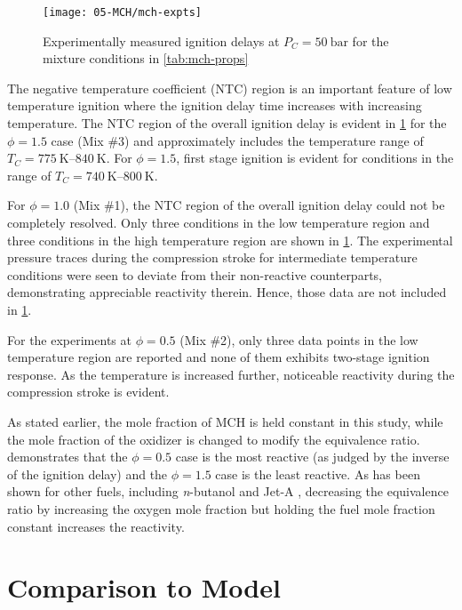 \documentclass[../main.tex]{subfiles}
\begin{document}
\begin{figure}
    \texttt{[image: 05-MCH/mch-expts]}
    \caption{Experimentally measured ignition delays at $P_C=\SI{50}{\bar}$ for the
    mixture conditions in \cref{tab:mch-props}}
    \label{fig:mch-expts}
\end{figure}

The negative temperature coefficient (NTC) region is an important feature of
low temperature ignition where the ignition delay time increases with
increasing temperature. The NTC region of the overall ignition delay is
evident in \cref{fig:mch-expts} for the $\phi=\num{1.5}$ case (Mix \#3) and
approximately includes the temperature range of $T_C=\SIrange{775}{840}{\kelvin}$. For
$\phi=\num{1.5}$, first stage ignition is evident for conditions in the range of
$T_C=\SIrange{740}{800}{\kelvin}$.

For $\phi=\num{1.0}$ (Mix \#1), the NTC region of the overall ignition delay could
not be completely resolved. Only three conditions in the low temperature region
and three conditions in the high temperature region are shown in
\cref{fig:mch-expts}. The experimental pressure traces during the compression
stroke for intermediate temperature conditions were seen to deviate from their
non-reactive counterparts, demonstrating appreciable reactivity therein. Hence,
those data are not included in \cref{fig:mch-expts}.

For the experiments at $\phi=\num{0.5}$ (Mix \#2), only three data points in the low
temperature region are reported and none of them exhibits two-stage ignition
response. As the temperature is increased further, noticeable reactivity during
the compression stroke is evident.

As stated earlier, the mole fraction of MCH is held constant in this study,
while the mole fraction of the oxidizer is changed to modify the equivalence
ratio.  demonstrates that the $\phi=\num{0.5}$ case is the most
reactive (as judged by the inverse of the ignition delay) and the $\phi=\num{1.5}$
case is the least reactive. As has been shown for other fuels, including
\textit{n}-butanol \cite{Weber2011} and Jet-A \cite{Kumar2010}, decreasing the
equivalence ratio by increasing the oxygen mole fraction but holding the fuel
mole fraction constant increases the reactivity.

\section{Comparison to Model}
\label{sec:model-comparison}
\end{document}
